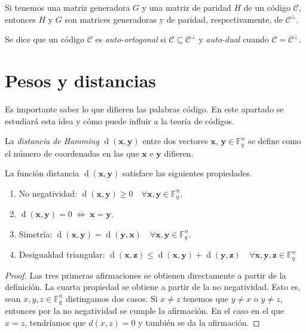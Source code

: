 \begin{proposition}
    Si tenemos una matriz generadora $G$ y una matriz de paridad $H$ de un código $\mathcal{C}$, entonces $H$ y $G$ son matrices generadoras y de paridad, respectivamente, de $\mathcal{C} ^{\perp}$.
\end{proposition}

Se dice que un código $\mathcal{C}$ es \emph{auto-ortogonal} si $\mathcal{C} \subseteq \mathcal{C} ^{\perp}$ y \emph{auto-dual} cuando $\mathcal{C} = \mathcal{C} ^{\perp}$.

\section{Pesos y distancias}

Es importante saber lo que difieren las palabras código. En este apartado se estudiará esta idea y cómo puede influir a la teoría de códigos.

\begin{definition}
    La \emph{distancia de Hamming} $\operatorname{d}(\mathbf{x},\mathbf{y})$ entre dos vectores $\mathbf{x}$, $\mathbf{y} \in \mathbb{F}_q^n$ se define como el número de coordenadas en las que $\mathbf{x}$ e $\mathbf{y}$ difieren.
\end{definition}

\begin{theorem}
    La función distancia $\operatorname{d}(\mathbf{x},\mathbf{y})$ satisface las siguientes propiedades.

    \begin{enumerate}
        \item No negatividad: $\operatorname{d}(\mathbf{x},\mathbf{y}) \geq 0 \quad \forall \mathbf{x},\mathbf{y} \in \mathbb{F}_q^n$.
        \item $\operatorname{d}(\mathbf{x},\mathbf{y}) = 0 \; \Leftrightarrow \; \mathbf{x} = \mathbf{y}$.
        \item Simetría: $\operatorname{d}(\mathbf{x},\mathbf{y}) = \operatorname{d}(\mathbf{y},\mathbf{x}) \quad \forall \mathbf{x},\mathbf{y} \in \mathbb{F}_q^n$.
        \item Desigualdad triangular: $\operatorname{d}(\mathbf{x},\mathbf{z}) \leq \operatorname{d}(\mathbf{x},\mathbf{y}) + \operatorname{d}(\mathbf{y},\mathbf{z}) \quad \forall \mathbf{x},\mathbf{y},\mathbf{z} \in \mathbb{F}_q^n$
    \end{enumerate}
\end{theorem}

\begin{proof}
    Las tres primeras afirmaciones se obtienen directamente a partir de la definición.
    La cuarta propiedad se obtiene a partir de la no negatividad. Esto es, sean 
    $x,y,z \in \mathbb{F}_q^n$ distingamos dos casos. Si $x \neq z$
    tenemos que $y \neq x$ o $y \neq z$, entonces por la no negatividad se cumple la afirmación.
    En el caso en el que $x = z$, tendríamos que $d(x,z) = 0$ y también se da la 
    afirmación.
\end{proof}

